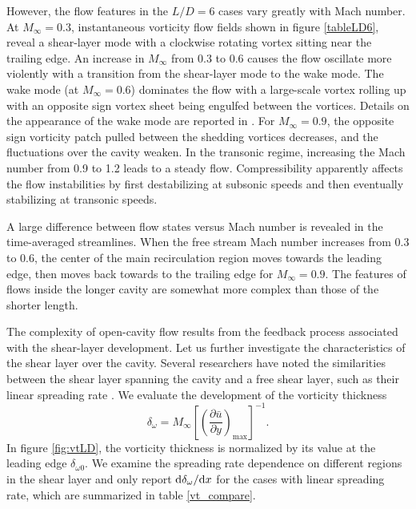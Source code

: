 \documentclass{jfm}
\begin{document}
However, the flow features in the $L/D=6$ cases vary greatly with Mach number. At $M_\infty = 0.3$, instantaneous vorticity flow fields shown in figure \ref{tableLD6}, reveal a shear-layer mode with a clockwise rotating vortex sitting near the trailing edge. An increase in $M_\infty$ from 0.3 to 0.6 causes the flow oscillate more violently with a transition from the shear-layer mode to the wake mode. The wake mode (at $M_\infty=0.6$) dominates the flow with a large-scale vortex rolling up with an opposite sign vortex sheet being engulfed between the vortices. 
Details on the appearance of the wake mode are reported in \cite{Sun:TCFD16}.
For $M_\infty = 0.9$, the opposite sign vorticity patch pulled between the shedding vortices decreases, and the fluctuations over the cavity weaken. In the transonic regime, increasing the Mach number from 0.9 to 1.2 leads to a steady flow. Compressibility apparently affects the flow instabilities by first destabilizing at subsonic speeds and then eventually stabilizing at transonic speeds.

A large difference between flow states versus Mach number is revealed in the time-averaged streamlines. When the free stream Mach number increases from 0.3 to 0.6, the center of the main recirculation region moves towards the leading edge, then moves back towards to the trailing edge for $M_\infty=0.9$. The features of flows inside the longer cavity are somewhat more complex than those of the shorter length. 
 
The complexity of open-cavity flow results from the feedback process associated with the shear-layer development. Let us further investigate the characteristics of the shear layer over the cavity. Several researchers have noted the similarities between the shear layer spanning the cavity and a free shear layer, such as their linear spreading rate \citep{Sarohia:1975,Cattafesta:AIAA97,Rowley:JFM02}. We evaluate the development of the vorticity thickness
\begin{equation}
\delta_\omega = M_\infty\left[\left(\frac{\partial \bar u}{\partial y}\right)_\text{max}\right]^{-1}.
\end{equation}
In figure \ref{fig:vtLD}, the vorticity thickness is normalized by its value at the leading edge $\delta_{\omega 0}$. We examine the spreading rate dependence on different regions in the shear layer and only report ${\rm d}\delta_\omega/{\rm d}x$ for the cases with linear spreading rate, which are summarized in table \ref{vt_compare}.
\end{document}
